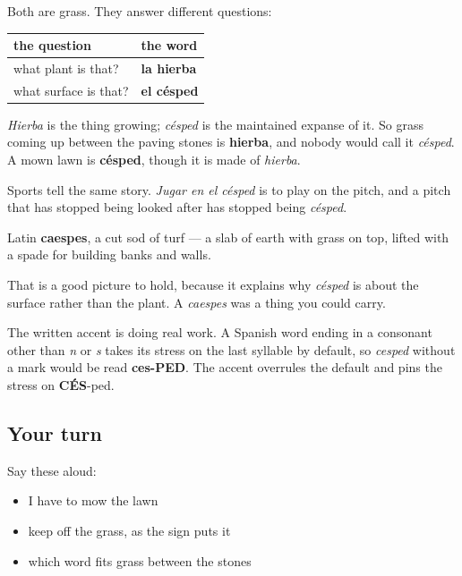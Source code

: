 \begin{grammarlens}[title={Grammar Lens: césped is not hierba}]
Both are grass. They answer different questions:

\noindent
\begin{tabularx}{\linewidth}{@{}>{\raggedright\arraybackslash}X>{\raggedright\arraybackslash}X@{}}
\toprule
\textbf{the question} & \textbf{the word} \\
\midrule
what plant is that? & \textbf{la hierba} \\
what surface is that? & \textbf{el césped} \\
\bottomrule
\end{tabularx}

\emph{Hierba} is the thing growing; \emph{césped} is the maintained expanse of it. So grass coming up between the paving stones is \textbf{hierba}, and nobody would call it \emph{césped}. A mown lawn is \textbf{césped}, though it is made of \emph{hierba}.

Sports tell the same story. \emph{Jugar en el césped} is to play on the pitch, and a pitch that has stopped being looked after has stopped being \emph{césped}.
\end{grammarlens}

\begin{cousinweb}
Latin \textbf{caespes}, a cut sod of turf — a slab of earth with grass on top, lifted with a spade for building banks and walls.

That is a good picture to hold, because it explains why \emph{césped} is about the surface rather than the plant. A \emph{caespes} was a thing you could carry.

The written accent is doing real work. A Spanish word ending in a consonant other than \emph{n} or \emph{s} takes its stress on the last syllable by default, so \emph{cesped} without a mark would be read \textbf{ces-PED}. The accent overrules the default and pins the stress on \textbf{CÉS}-ped.
\end{cousinweb}

\subsection*{Your turn}
Say these aloud:

\begin{itemize}
\raggedright
  \item I have to mow the lawn
  \item keep off the grass, as the sign puts it
  \item which word fits grass between the stones
\end{itemize}

